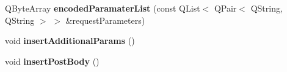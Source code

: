 \begin{DoxyCompactItemize}
\item 
\mbox{\label{class_k_q_o_auth_request_private_a4fbb517e0621a8f717382bb949bf6b0a}} 
Q\+Byte\+Array {\bfseries encoded\+Paramater\+List} (const Q\+List$<$ Q\+Pair$<$ Q\+String, Q\+String $>$ $>$ \&request\+Parameters)
\item 
\mbox{\label{class_k_q_o_auth_request_private_ace5c9bfddab2a7eba8cbb516c0313cd3}} 
void {\bfseries insert\+Additional\+Params} ()
\item 
\mbox{\label{class_k_q_o_auth_request_private_af9b4770f54fafb039b0bb3d20ac18e6c}} 
void {\bfseries insert\+Post\+Body} ()
\end{DoxyCompactItemize}
